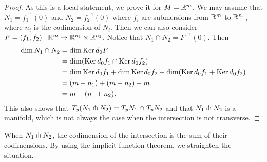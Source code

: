 \begin{proof}
    As this is a local statement, we prove it for $M = \mathbb{R}^{m}$.
    We may assume that $N_1 = f_1^{-1}(0)$ and $ N_2 = f_2^{-1}(0)$ where $f_i$ are submersions from $\mathbb{R}^{m}$ to $\mathbb{R}^{n_i}$, where $n_i$ is the codimension of $N_i$.
    Then we can also consider $F= (f_1, f_2): \mathbb{R}^{m} \to  \mathbb{R}^{n_1} \times \mathbb{R}^{n_2}$.
    Notice that $ N_1 \cap N_2 = F^{-1}(0)$.
    Then
    \begin{align*}
        \dim N_1 \cap  N_2 &= \dim \operatorname{Ker} d_0F\\
                           &= \dim(\operatorname{Ker} d_0 f_1 \cap \operatorname{Ker} d_0 f_2)\\
                           &= \dim \operatorname{Ker} d_0 f_1 + \dim \operatorname{Ker} d_0 f_2 - \dim (\operatorname{Ker} d_0 f_1 + \operatorname{Ker} d_0 f_2)\\
                           &= (m - n_1) + (m - n_2) - m\\
                           &= m - (n_1 + n_2)
    .\end{align*} 
    This also shows that $T_p(N_1 \pitchfork N_2) = T_pN_1 \pitchfork T_pN_2$ and that $ N_1 \pitchfork N_2$ is a manifold, which is not always the case when the intersection is not transverse.
\end{proof}
\begin{marginfigure}[-5cm]
    \centering
    \caption{When $N_1 \pitchfork N_2$, the codimension of the intersection is the sum of their codimensions. By using the implicit function theorem, we straighten the situation.}
    \label{fig:codimensions-transverse}
\end{marginfigure}

